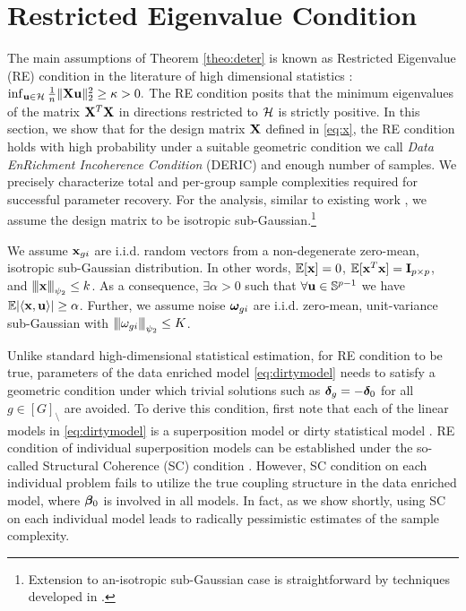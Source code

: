 \section{Restricted Eigenvalue Condition}
\label{sec:re}
The main assumptions of Theorem \ref{theo:deter} is known as Restricted Eigenvalue (RE) condition in the literature of high dimensional statistics \cite{banerjee14, nrwy12, raskutti10}:
$\inf_{\mathbf{u} \in {\cal H}} \frac{1}{n} \|\mathbf{X} \mathbf{u}\|_{2}^2 \geq \kappa > 0.$
The RE condition posits that the minimum eigenvalues of the matrix $\mathbf{X}^T \mathbf{X}$ in directions restricted to ${\cal H}$ is strictly positive.
In this section, we show that for the design matrix $\mathbf{X}$ defined in \eqref{eq:x}, the RE condition holds with high probability under a suitable geometric condition we call {\em Data EnRichment Incoherence Condition} (DERIC) and enough number of samples.
We precisely characterize total and per-group sample complexities required for successful parameter recovery.
For the analysis, similar to existing work \cite{trop15, mend15, guba16}, we assume the design matrix to be isotropic sub-Gaussian.\footnote{Extension to an-isotropic sub-Gaussian case is straightforward by techniques developed in \cite{banerjee14, ruzh13}.}
\begin{definition}
	\label{def:obs}
	We assume $\mathbf{x}_{gi}$ are i.i.d. random vectors from a non-degenerate zero-mean, isotropic sub-Gaussian distribution. In other words, $\mathbb{E} [\mathbf{x}] = 0$, $\mathbb{E} [\mathbf{x}^T \mathbf{x}] = \mathbf{I}_{p \times p}$, and ${\left\vert\kern-0.25ex\left\vert\kern-0.25ex\left\vert \mathbf{x} \right\vert\kern-0.25ex\right\vert\kern-0.25ex\right\vert}_{\psi_2} \leq k$.	
As a consequence, $\exists \alpha > 0$ such that $\forall \mathbf{u} \in \mathbb S^{p-1}$ we have $ \mathbb{E}|\langle \mathbf{x}, \mathbf{u} \rangle| \geq \alpha$. Further, we assume noise $\boldsymbol{\omega}_{gi} $ are i.i.d.
zero-mean, unit-variance sub-Gaussian with ${\left\vert\kern-0.25ex\left\vert\kern-0.25ex\left\vert \omega_{gi} \right\vert\kern-0.25ex\right\vert\kern-0.25ex\right\vert}_{\psi_2} \leq K$.
\end{definition}


Unlike standard high-dimensional statistical estimation, for RE condition to be true, parameters of the data enriched model \eqref{eq:dirtymodel} needs to satisfy a geometric condition under which trivial solutions such as $\boldsymbol{\delta}_g=-\boldsymbol{\delta}_0$ for all $g \in [G]_\setminus$ are avoided.
To derive this condition, first note that each of the linear models in \eqref{eq:dirtymodel} is a superposition model \cite{guba16} or dirty statistical model \cite{yara13}. RE condition of individual superposition models can be established under the so-called Structural Coherence (SC) condition \cite{guba16, mctr13}. However, SC condition on each individual problem fails to utilize the true coupling structure in the data enriched model, where $\boldsymbol{\beta}_0$ is involved in all models. In fact, as we show shortly, using SC on each individual model leads to radically pessimistic estimates of the sample complexity.

